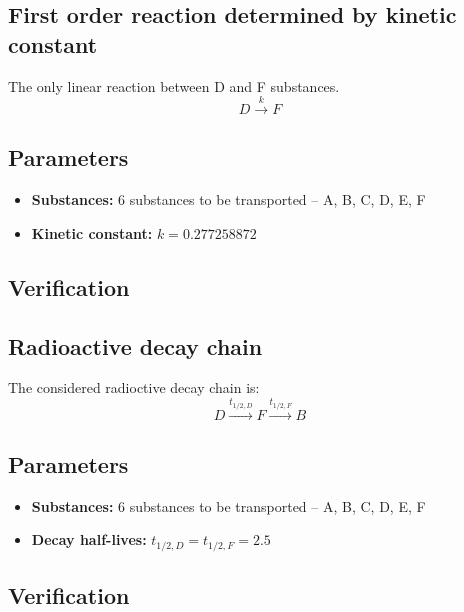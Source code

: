  
\subsection{First order reaction determined by kinetic constant}
The only linear reaction between D and F substances.
\[
D\xrightarrow{k}F
\]

\subsection*{Parameters}
\begin{itemize}
  \item \textbf{Substances:} 6 substances to be transported -- A, B, C, D, E, F
  \item \textbf{Kinetic constant:} $k = 0.277258872$
\end{itemize}

\subsection*{Verification}

\subsection{Radioactive decay chain}
The considered radioctive decay chain is:
\[
 D\xrightarrow{t_{1/2,D}}F\xrightarrow{t_{1/2,F}}B
\]
\subsection*{Parameters}
\begin{itemize}
  \item \textbf{Substances:} 6 substances to be transported -- A, B, C, D, E, F
  \item \textbf{Decay half-lives:} $t_{1/2,D} = t_{1/2,F} = 2.5$
\end{itemize}

\subsection*{Verification}


